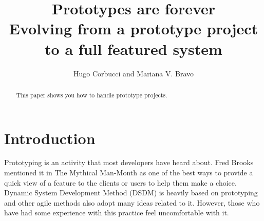 \documentclass[lnbip]{svmultln}
\begin{document}
%
\mainmatter              %
%
\title{Prototypes are forever\\
  Evolving from a prototype project to a full featured system}
%
%
\author{Hugo Corbucci and Mariana V. Bravo }
%
%
%

\maketitle              %

\begin{abstract}        %

This paper shows you how to handle prototype projects.

\end{abstract}
%
\section{Introduction}

Prototyping is an activity that most developers have heard about. Fred
Brooks mentioned it in The Mythical Man-Month \cite{Brooks1975} as one
of the best ways to provide a quick view of a feature to the clients
or users to help them make a choice. Dynamic System Development Method
(DSDM)\cite{DSDM} is heavily based on prototyping and other agile
methods also adopt many ideas related to it. However, those who have
had some experience with this practice feel uncomfortable with it.
\end{document}
